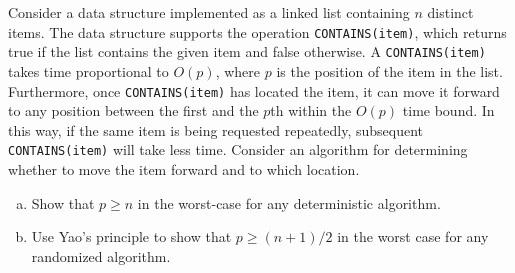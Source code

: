 \documentclass[fleqn]{homework}
\begin{document}
  \begin{problem}{3}
    \begin{question}
      Consider a data structure implemented as a linked list containing $n$
      distinct items.  The data structure supports the operation
      \texttt{CONTAINS(item)}, which returns true if the list contains the given
      item and false otherwise.  A \texttt{CONTAINS(item)} takes time
      proportional to $O(p)$, where $p$ is the position of the item in the
      list.  Furthermore, once \texttt{CONTAINS(item)} has located the item, it
      can move it forward to any position between the first and the $p$th within
      the $O(p)$ time bound.  In this way, if the same item is being requested
      repeatedly, subsequent \texttt{CONTAINS(item)} will take less time.
      Consider an algorithm for determining whether to move the item forward and
      to which location.

      \begin{enumerate}[a.]
      \item Show that $p \ge n$ in the worst-case for any deterministic
        algorithm.
      \item Use Yao's principle to show that $p \ge (n+1) / 2$ in the worst case
        for any randomized algorithm.
      \end{enumerate}
    \end{question}
  \end{problem}
\end{document}
